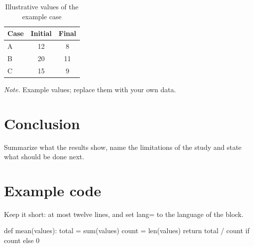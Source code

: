 \documentclass[a4paper,12pt]{report}
\numberwithin{equation}{chapter}
\begin{document}
  \begin{table}[H]
    \caption{Illustrative values of the example case}
    \label{tab:values}
    \begin{tabular}{@{}lcc@{}}
      \toprule
      Case & Initial & Final \\
      \midrule
      A & 12 & 8 \\
      B & 20 & 11 \\
      C & 15 & 9 \\
      \bottomrule
    \end{tabular}
    \par\medskip
    \begin{minipage}{\linewidth}
      \footnotesize\textit{Note.} Example values; replace them with your own data.
    \end{minipage}
  \end{table}

  \chapter{Conclusion}
  Summarize what the results show, name the limitations of the study and
  state what should be done next.

  
  

  \appendix
  \chapter{Example code}
  Keep it short: at most twelve lines, and set lang= to the language of the
  block.

  \begin{code}[lang=python, numbers=true]
def mean(values):
    total = sum(values)
    count = len(values)
    return total / count if count else 0
  \end{code}
\end{document}
